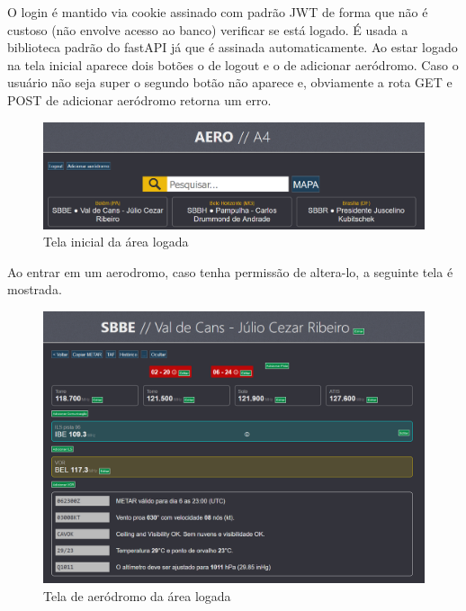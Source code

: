 O login é mantido via cookie assinado com padrão JWT de forma que não é custoso 
(não envolve acesso ao banco) verificar se está logado. É usada a biblioteca padrão 
do fastAPI já que é assinada automaticamente.
Ao estar logado na tela inicial aparece dois botões o de logout e o de adicionar 
aeródromo. Caso o usuário não seja super o segundo botão não aparece e, obviamente 
a rota GET e POST de adicionar aeródromo retorna um erro.

\begin{figure}[ht]
    \begin{center}
    \includegraphics[width=\linewidth]{img/area-restrita-root.png}
    \caption{Tela inicial da área logada}
    \label{fig:max-priv-sys}
    \end{center}
\end{figure}

Ao entrar em um aerodromo, caso tenha permissão de altera-lo, a seguinte tela
é mostrada.

\begin{figure}[ht]
    \begin{center}
    \includegraphics[width=\linewidth]{img/admin-root.png}
    \caption{Tela de aeródromo da área logada}
    \label{fig:max-priv-sys}
    \end{center}
\end{figure}


